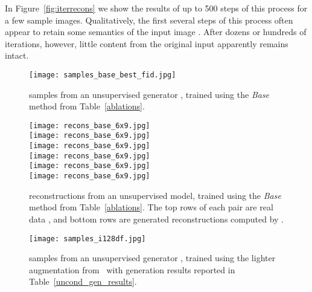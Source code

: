 In Figure~\ref{fig:iterrecons} we show the results of up to 500 steps of this process for a few sample images.
Qualitatively, the first several steps of this process often appear to retain some semantics of the input image .
After dozens or hundreds of iterations, however, little content from the original input apparently remains intact.

\begin{figure}
\centering
 \texttt{[image: samples\_base\_best\_fid.jpg]}

 \caption{
   samples  from an unsupervised \method{} generator , trained using the \textit{Base} method from Table~\ref{ablations}.
}
 \label{fig:samples_128}
\end{figure}

\begin{figure}
\centering

 \texttt{[image: recons\_base\_6x9.jpg]}
 \\ \vspace{0.1cm}
 \texttt{[image: recons\_base\_6x9.jpg]}
 \\ \vspace{0.1cm}
 \texttt{[image: recons\_base\_6x9.jpg]}
 \\ \vspace{0.1cm}
 \texttt{[image: recons\_base\_6x9.jpg]}
 \\ \vspace{0.1cm}
 \texttt{[image: recons\_base\_6x9.jpg]}
 \\ \vspace{0.1cm}
 \texttt{[image: recons\_base\_6x9.jpg]}
 \caption{
   reconstructions from an unsupervised \method{} model, trained using the \textit{Base} method from Table~\ref{ablations}.
  The top rows of each pair are real data , and bottom rows are generated reconstructions computed by .
}
 \label{fig:more_recons_128}
\end{figure}

\begin{figure}
\centering




 \texttt{[image: samples\_i128df.jpg]}
 \caption{
   samples  from an unsupervised \method{} generator , trained using the lighter augmentation from~\cite{zurichfewer} with generation results reported in Table~\ref{uncond_gen_results}.
 }
 \label{fig:samples_i128lightaug}
\end{figure}

